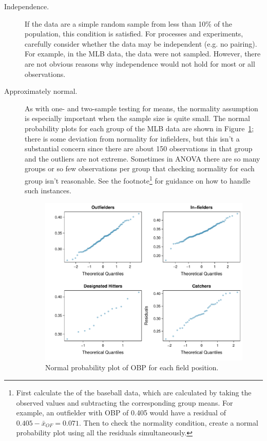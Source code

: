 \begin{description}
\item[Independence.] If the data are a simple random sample from less than 10\% of the population, this condition is satisfied. For processes and experiments, carefully consider whether the data may be independent (e.g. no pairing). For example, in the MLB data, the data were not sampled. However, there are not obvious reasons why independence would not hold for most or all observations.
\item[Approximately normal.] As with one- and two-sample testing for means, the normality assumption is especially important when the sample size is quite small. The normal probability plots for each group of the MLB data are shown in Figure~\ref{mlbANOVADiagNormalityGroups}; there is some deviation from normality for infielders, but this isn't a substantial concern since there are about 150 observations in that group and the outliers are not extreme. Sometimes in ANOVA there are so many groups or so few observations per group that checking normality for each group isn't reasonable. See the footnote\footnote{First calculate the  of the baseball data, which are calculated by taking the observed values and subtracting the corresponding group means. For example, an outfielder with OBP of 0.405 would have a residual of $0.405 - \bar{x}_{OF} = 0.071$. Then to check the normality condition, create a normal probability plot using all the residuals simultaneously.} for guidance on how to handle such instances.

\begin{figure}[hhh]
\centering
\includegraphics[width=\textwidth]{ch_inference_for_means/figures/mlbANOVA/mlbANOVADiagNormalityGroups}
\caption{Normal probability plot of OBP for each field position.}
\label{mlbANOVADiagNormalityGroups}
\end{figure}


\end{description}
